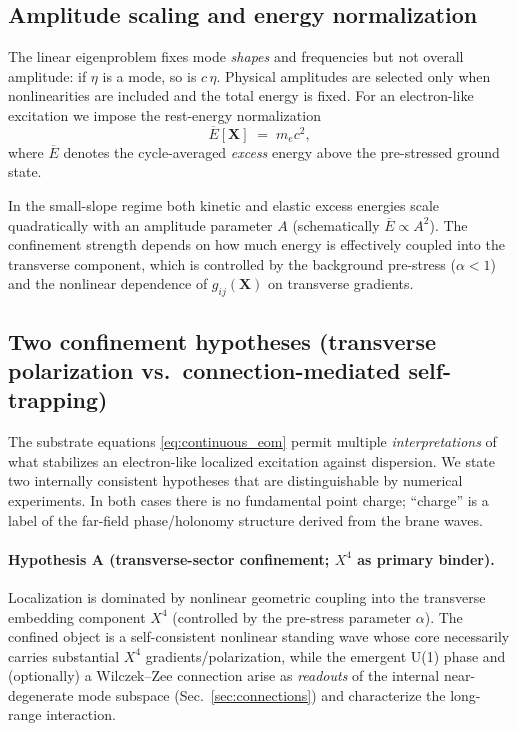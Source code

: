 \documentclass[11pt,a4paper]{article}
\newcommand{\X}{\mathbf{X}}                 %
\begin{document}
\subsection{Amplitude scaling and energy normalization}
\label{subsec:amplitude_scaling}

The linear eigenproblem fixes mode \emph{shapes} and frequencies but not overall amplitude:
if \(\eta\) is a mode, so is \(c\,\eta\). Physical amplitudes are selected only when nonlinearities are included
and the total energy is fixed. For an electron-like excitation we impose the rest-energy normalization
\begin{equation}
\overline{E}[\X] \;=\; m_e c^2,
\label{eq:rest_energy_normalization}
\end{equation}
where \(\overline{E}\) denotes the cycle-averaged \emph{excess} energy above the pre-stressed ground state.

In the small-slope regime both kinetic and elastic excess energies scale quadratically with an amplitude
parameter \(A\) (schematically \(\overline{E}\propto A^2\)). The confinement strength depends on how much energy
is effectively coupled into the transverse component, which is controlled by the background pre-stress
(\(\alpha<1\)) and the nonlinear dependence of \(g_{ij}(\X)\) on transverse gradients.


\subsection{Two confinement hypotheses (transverse polarization vs.\ connection-mediated self-trapping)}
\label{subsec:confinement_hypotheses}

The substrate equations \eqref{eq:continuous_eom} permit multiple \emph{interpretations} of what stabilizes an
electron-like localized excitation against dispersion. We state two internally consistent hypotheses that are
distinguishable by numerical experiments. In both cases there is no fundamental point charge; ``charge'' is a
label of the far-field phase/holonomy structure derived from the brane waves.

\paragraph{Hypothesis A (transverse-sector confinement; \(X^4\) as primary binder).}
Localization is dominated by nonlinear geometric coupling into the transverse embedding component \(X^4\)
(controlled by the pre-stress parameter \(\alpha\)). The confined object is a self-consistent nonlinear standing
wave whose core necessarily carries substantial \(X^4\) gradients/polarization, while the emergent U(1) phase and
(optionally) a Wilczek--Zee connection arise as \emph{readouts} of the internal near-degenerate mode subspace
(Sec.~\ref{sec:connections}) and characterize the long-range interaction.
\end{document}
